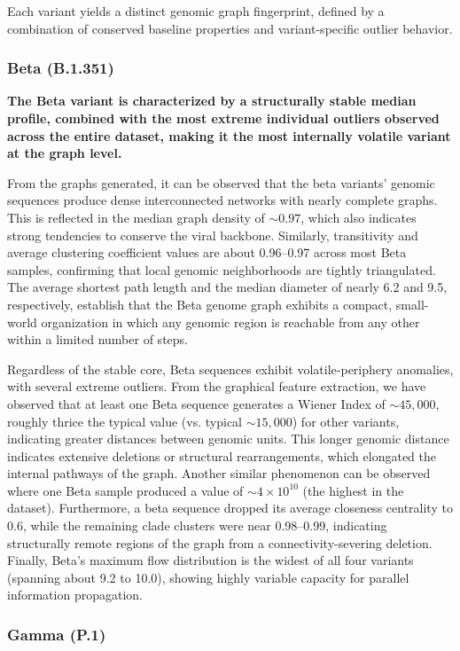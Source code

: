 \documentclass[conference]{IEEEtran}
\begin{document}
Each variant yields a distinct genomic graph fingerprint, defined by a combination of conserved baseline properties and variant-specific outlier behavior.

\subsubsection{Beta (B.1.351)}

\textbf{The Beta variant is characterized by a structurally stable median profile, combined with the most extreme individual outliers observed across the entire dataset, making it the most internally volatile variant at the graph level.}

From the graphs generated, it can be observed that the beta variants' genomic sequences produce dense interconnected networks with nearly complete graphs. This is reflected in the median graph density of $\sim 0.97$, which also indicates strong tendencies to conserve the viral backbone. Similarly, transitivity and average clustering coefficient values are about 0.96--0.97 across most Beta samples, confirming that local genomic neighborhoods are tightly triangulated. The average shortest path length and the median diameter of nearly 6.2 and 9.5, respectively, establish that the Beta genome graph exhibits a compact, small-world organization in which any genomic region is reachable from any other within a limited number of steps.

Regardless of the stable core, Beta sequences exhibit volatile-periphery anomalies, with several extreme outliers. From the graphical feature extraction, we have observed that at least one Beta sequence generates a Wiener Index of $\sim 45{,}000$, roughly thrice the typical value (vs. typical $\sim 15{,}000$) for other variants, indicating greater distances between genomic units. This longer genomic distance indicates extensive deletions or structural rearrangements, which elongated the internal pathways of the graph. Another similar phenomenon can be observed where one Beta sample produced a value of $\sim 4\times10^{10}$ (the highest in the dataset). Furthermore, a beta sequence dropped its average closeness centrality to 0.6, while the remaining clade clusters were near 0.98--0.99, indicating structurally remote regions of the graph from a connectivity-severing deletion. Finally, Beta's maximum flow distribution is the widest of all four variants (spanning about 9.2 to 10.0), showing highly variable capacity for parallel information propagation.

\subsubsection{Gamma (P.1)}
\end{document}
